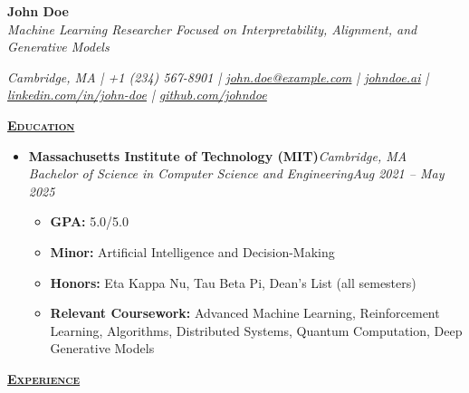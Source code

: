\documentclass[10pt]{article}
\newcommand{\styledLink}[2]{\href{#1}{\textcolor{accentcolor}{\underline{#2}}}}
\newcommand{\resumeSection}[1]{\noindent\uline{\textcolor{accentcolor}{\textbf{\textsc{#1}}}\hfill}\par}
\newcommand{\splitEntry}[2]{#1\hfill\textit{#2}}
\begin{document}
  \raggedright

  \textbf{\Large John Doe} \\[2pt]
  \textit{Machine Learning Researcher Focused on Interpretability, Alignment, and Generative Models}

  {\itshape
    Cambridge, MA |
    +1 (234) 567-8901 |
    \styledLink{mailto:john.doe@example.com}{john.doe@example.com} |
    \styledLink{https://johndoe.ai}{johndoe.ai} |
    \styledLink{https://linkedin.com/in/john-doe}{linkedin.com/in/john-doe} |
    \styledLink{https://github.com/johndoe}{github.com/johndoe}
  }

  \resumeSection{Education}

  \begin{itemize}
    \item {
      \splitEntry{\textbf{Massachusetts Institute of Technology (MIT)}}{Cambridge, MA} \\
      \splitEntry{\textit{Bachelor of Science in Computer Science and Engineering}}{Aug 2021 -- May 2025}

      \begin{itemize}
        \item \textbf{GPA:} 5.0/5.0
        \item \textbf{Minor:} Artificial Intelligence and Decision-Making
        \item \textbf{Honors:} Eta Kappa Nu, Tau Beta Pi, Dean's List (all semesters)
        \item \textbf{Relevant Coursework:} Advanced Machine Learning, Reinforcement Learning, Algorithms, Distributed Systems, Quantum Computation, Deep Generative Models
      \end{itemize}
    }
  \end{itemize}

  \resumeSection{Experience}
\end{document}
